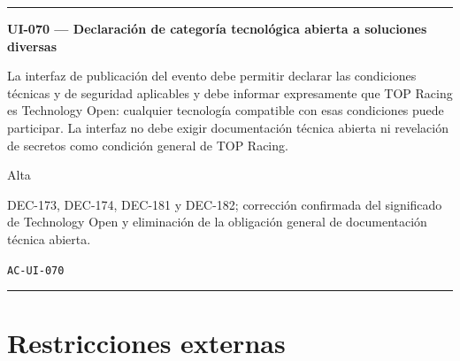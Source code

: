 \documentclass[10pt,letterpaper]{article}
\begin{document}
\vspace{0.25em}\hrule\vspace{0.65em}
\noindent\textbf{UI-070 --- Declaración de categoría tecnológica abierta a soluciones diversas}\par
\begin{description}[style=nextline,leftmargin=3.15cm,labelwidth=2.8cm,font=\normalfont\bfseries]
\item[Obligación] La interfaz de publicación del evento debe permitir declarar las condiciones técnicas y de seguridad aplicables y debe informar expresamente que TOP Racing es Technology Open: cualquier tecnología compatible con esas condiciones puede participar. La interfaz no debe exigir documentación técnica abierta ni revelación de secretos como condición general de TOP Racing.
\item[Prioridad] Alta
\item[Procedencia] DEC-173, DEC-174, DEC-181 y DEC-182; corrección confirmada del significado de Technology Open y eliminación de la obligación general de documentación técnica abierta.
\item[Verificación] \texttt{AC-UI-070}
\end{description}
\vspace{0.25em}\hrule\vspace{0.65em}
\section{Restricciones externas}
\end{document}
